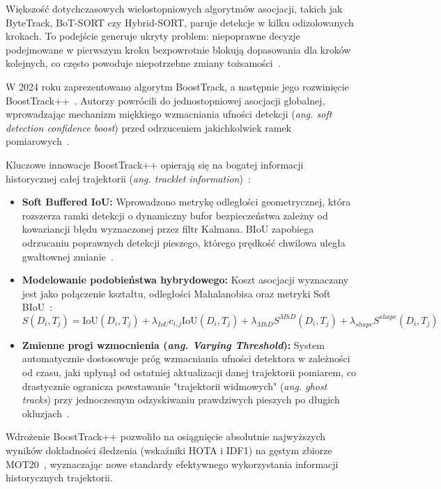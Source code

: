 Większość dotychczasowych wielostopniowych algorytmów asocjacji, takich jak ByteTrack, BoT-SORT czy
Hybrid-SORT, paruje detekcje w kilku odizolowanych krokach. To podejście generuje ukryty problem:
niepoprawne decyzje podejmowane w pierwszym kroku bezpowrotnie blokują dopasowania dla kroków
kolejnych, co często powoduje niepotrzebne zmiany tożsamości~\cite{stanojevic2024boosttrackpp,
  stanojevic2024boosttrack}.

W 2024 roku zaprezentowano algorytm BoostTrack, a następnie jego rozwinięcie
BoostTrack++~\cite{stanojevic2024boosttrackpp}. Autorzy powrócili do jednostopniowej asocjacji
globalnej, wprowadzając mechanizm miękkiego wzmacniania ufności detekcji (\textit{ang. soft
  detection confidence boost}) przed odrzuceniem jakichkolwiek ramek
pomiarowych~\cite{stanojevic2024boosttrackpp}.

Kluczowe innowacje BoostTrack++ opierają się na bogatej informacji historycznej całej trajektorii
(\textit{ang. tracklet information})~\cite{stanojevic2024boosttrackpp}:
\begin{itemize}
  \item \textbf{Soft Buffered IoU:} Wprowadzono metrykę odległości geometrycznej, która rozszerza ramki detekcji o dynamiczny bufor bezpieczeństwa zależny od kowariancji błędu wyznaczonej przez filtr Kalmana. BIoU zapobiega odrzucaniu poprawnych detekcji pieszego, którego prędkość chwilowa uległa gwałtownej zmianie~\cite{stanojevic2024boosttrackpp}.
  \item \textbf{Modelowanie podobieństwa hybrydowego:} Koszt asocjacji wyznaczany jest jako połączenie kształtu, odległości Mahalanobisa oraz metryki Soft BIoU~\cite{stanojevic2024boosttrackpp}:
        \begin{equation}
          S(D_i, T_j) = \text{IoU}(D_i, T_j) + \lambda_{IoU} c_{i,j} \text{IoU}(D_i, T_j) + \lambda_{MhD} S^{MhD}(D_i, T_j) + \lambda_{shape} S^{shape}(D_i, T_j)
        \end{equation}
  \item \textbf{Zmienne progi wzmocnienia (\textit{ang. Varying Threshold}):} System automatycznie dostosowuje próg wzmacniania ufności detektora w zależności od czasu, jaki upłynął od ostatniej aktualizacji danej trajektorii pomiarem, co drastycznie ogranicza powstawanie "trajektorii widmowych" (\textit{ang. ghost tracks}) przy jednoczesnym odzyskiwaniu prawdziwych pieszych po długich okluzjach~\cite{stanojevic2024boosttrackpp}.
\end{itemize}

Wdrożenie BoostTrack++ pozwoliło na osiągnięcie absolutnie najwyższych wyników dokładności
śledzenia (wskaźniki HOTA i IDF1) na gęstym zbiorze MOT20~\cite{stanojevic2024boosttrackpp},
wyznaczając nowe standardy efektywnego wykorzystania informacji historycznych trajektorii.


